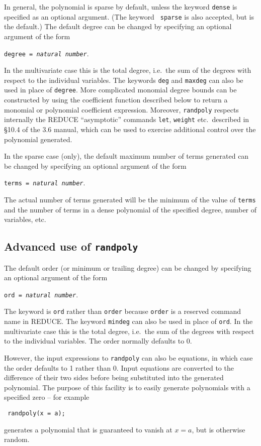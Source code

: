 In general, the polynomial is sparse by default, unless the keyword
{\tt dense} is specified as an optional argument.  (The keyword {\tt
sparse} is also accepted, but is the default.)  The default degree can
be changed by specifying an optional argument of the form
\begin{center}
  {\tt degree = {\it natural number}}.
\end{center}
In the multivariate case this is the total degree, i.e.\ the sum of
the degrees with respect to the individual variables.  The keywords
{\tt deg} and {\tt maxdeg} can also be used in place of {\tt degree}.
More complicated monomial degree bounds can be constructed by using
the coefficient function described below to return a monomial or
polynomial coefficient expression.  Moreover, {\tt randpoly} respects
internally the REDUCE ``asymptotic'' commands {\tt let}, {\tt weight}
etc.\ described in \S10.4 of the \REDUCE{} 3.6 manual, which can be used
to exercise additional control over the polynomial generated.

In the sparse case (only), the default maximum number of terms
generated can be changed by specifying an optional argument of the
form
\begin{center}
  {\tt terms = {\it natural number}}.
\end{center}
The actual number of terms generated will be the minimum of the value
of {\tt terms} and the number of terms in a dense polynomial of the
specified degree, number of variables, etc.


\subsection{Advanced use of {\tt randpoly}}
\label{randpolysec:Advanced}

The default order (or minimum or trailing degree) can be changed by
specifying an optional argument of the form
\begin{center}
  {\tt ord = {\it natural number}}.
\end{center}
The keyword is {\tt ord} rather than {\tt order} because {\tt order}
is a reserved command name in REDUCE\@.  The keyword {\tt mindeg} can
also be used in place of {\tt ord}.  In the multivariate case this is
the total degree, i.e.\ the sum of the degrees with respect to the
individual variables.  The order normally defaults to 0.

However, the input expressions to {\tt randpoly} can also be
equations, in which case the order defaults to 1 rather than 0.  Input
equations are converted to the difference of their two sides before
being substituted into the generated polynomial.  The purpose of this
facility is to easily generate polynomials with a specified zero -- for
example
\begin{center}\tt
  randpoly(x = a);
\end{center}
generates a polynomial that is guaranteed to vanish at $x = a$, but is
otherwise random.

